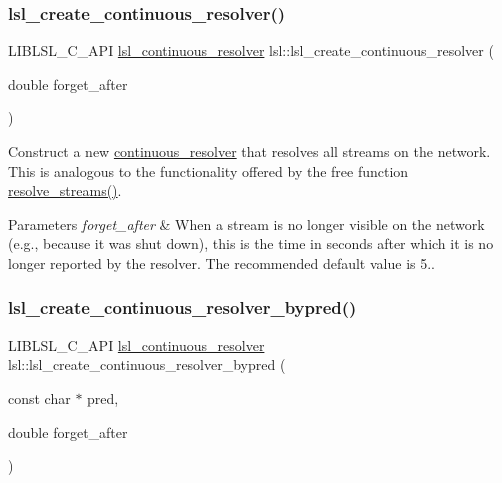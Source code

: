 \subsubsection{\texorpdfstring{lsl\+\_\+create\+\_\+continuous\+\_\+resolver()}{lsl\_create\_continuous\_resolver()}}
{\footnotesize\ttfamily L\+I\+B\+L\+S\+L\+\_\+\+C\+\_\+\+A\+PI \hyperlink{namespacelsl_ab09ea0488f986f056322c3c866dc0a0f}{lsl\+\_\+continuous\+\_\+resolver} lsl\+::lsl\+\_\+create\+\_\+continuous\+\_\+resolver (\begin{DoxyParamCaption}\item[{double}]{forget\+\_\+after }\end{DoxyParamCaption})}

Construct a new \hyperlink{classlsl_1_1continuous__resolver}{continuous\+\_\+resolver} that resolves all streams on the network. This is analogous to the functionality offered by the free function \hyperlink{namespacelsl_a2935ff3db04cd640f69943ad14a61915}{resolve\+\_\+streams()}. 
\begin{DoxyParams}{Parameters}
{\em forget\+\_\+after} & When a stream is no longer visible on the network (e.\+g., because it was shut down), this is the time in seconds after which it is no longer reported by the resolver. The recommended default value is 5.. \\
\hline
\end{DoxyParams}
\mbox{\label{namespacelsl_a632a18d8a150be1ae72efac7074c476d}} 
\subsubsection{\texorpdfstring{lsl\+\_\+create\+\_\+continuous\+\_\+resolver\+\_\+bypred()}{lsl\_create\_continuous\_resolver\_bypred()}}
{\footnotesize\ttfamily L\+I\+B\+L\+S\+L\+\_\+\+C\+\_\+\+A\+PI \hyperlink{namespacelsl_ab09ea0488f986f056322c3c866dc0a0f}{lsl\+\_\+continuous\+\_\+resolver} lsl\+::lsl\+\_\+create\+\_\+continuous\+\_\+resolver\+\_\+bypred (\begin{DoxyParamCaption}\item[{const char $\ast$}]{pred,  }\item[{double}]{forget\+\_\+after }\end{DoxyParamCaption})}

